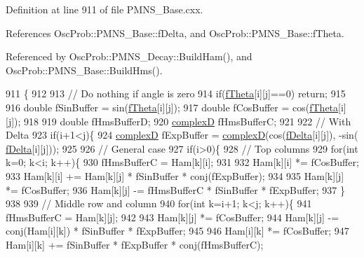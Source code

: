 Definition at line 911 of file P\+M\+N\+S\+\_\+\+Base.\+cxx.



References Osc\+Prob\+::\+P\+M\+N\+S\+\_\+\+Base\+::f\+Delta, and Osc\+Prob\+::\+P\+M\+N\+S\+\_\+\+Base\+::f\+Theta.



Referenced by Osc\+Prob\+::\+P\+M\+N\+S\+\_\+\+Decay\+::\+Build\+Ham(), and Osc\+Prob\+::\+P\+M\+N\+S\+\_\+\+Base\+::\+Build\+Hms().


\begin{DoxyCode}
911                                                                         \{
912 
913   \textcolor{comment}{// Do nothing if angle is zero}
914   \textcolor{keywordflow}{if}(\hyperlink{classOscProb_1_1PMNS__Base_a1976887cd658dd86b2336c181f1470b4}{fTheta}[i][j]==0) \textcolor{keywordflow}{return};
915 
916   \textcolor{keywordtype}{double} fSinBuffer = sin(\hyperlink{classOscProb_1_1PMNS__Base_a1976887cd658dd86b2336c181f1470b4}{fTheta}[i][j]);
917   \textcolor{keywordtype}{double} fCosBuffer = cos(\hyperlink{classOscProb_1_1PMNS__Base_a1976887cd658dd86b2336c181f1470b4}{fTheta}[i][j]);
918 
919   \textcolor{keywordtype}{double}  fHmsBufferD;
920   \hyperlink{EigenPoint_8h_a67ca8e107e20610c3fff78d5e726ece0}{complexD} fHmsBufferC;
921 
922   \textcolor{comment}{// With Delta}
923   \textcolor{keywordflow}{if}(i+1<j)\{
924     \hyperlink{EigenPoint_8h_a67ca8e107e20610c3fff78d5e726ece0}{complexD} fExpBuffer = \hyperlink{EigenPoint_8h_a67ca8e107e20610c3fff78d5e726ece0}{complexD}(cos(\hyperlink{classOscProb_1_1PMNS__Base_ab2a5fa40e689b221c8a7d2c17213810d}{fDelta}[i][j]), -sin(
      \hyperlink{classOscProb_1_1PMNS__Base_ab2a5fa40e689b221c8a7d2c17213810d}{fDelta}[i][j]));
925 
926     \textcolor{comment}{// General case}
927     \textcolor{keywordflow}{if}(i>0)\{
928       \textcolor{comment}{// Top columns}
929       \textcolor{keywordflow}{for}(\textcolor{keywordtype}{int} k=0; k<i; k++)\{
930         fHmsBufferC = Ham[k][i];
931 
932         Ham[k][i] *= fCosBuffer;
933         Ham[k][i] += Ham[k][j] * fSinBuffer * conj(fExpBuffer);
934 
935         Ham[k][j] *= fCosBuffer;
936         Ham[k][j] -= fHmsBufferC * fSinBuffer * fExpBuffer;
937       \}
938 
939       \textcolor{comment}{// Middle row and column}
940       \textcolor{keywordflow}{for}(\textcolor{keywordtype}{int} k=i+1; k<j; k++)\{
941         fHmsBufferC = Ham[k][j];
942 
943         Ham[k][j] *= fCosBuffer;
944         Ham[k][j] -= conj(Ham[i][k]) * fSinBuffer * fExpBuffer;
945 
946         Ham[i][k] *= fCosBuffer;
947         Ham[i][k] += fSinBuffer * fExpBuffer * conj(fHmsBufferC);

\end{DoxyCode}
